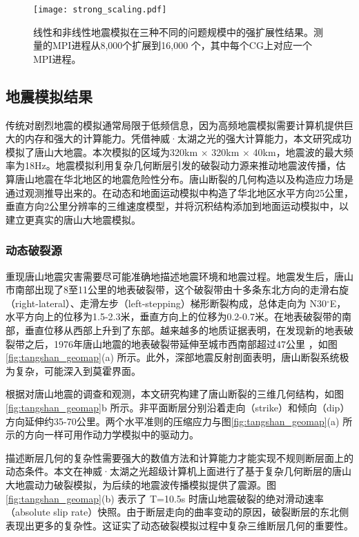 \begin{figure}[ht]
\centering
\texttt{[image: strong\_scaling.pdf]}
\caption{线性和非线性地震模拟在三种不同的问题规模中的强扩展性结果。测量的MPI进程从8,000个扩展到16,000 个，其中每个CG上对应一个MPI进程。}
\label{fig:strong-scaling}
\end{figure}


\subsection{地震模拟结果}

传统对剧烈地震的模拟通常局限于低频信息，因为高频地震模拟需要计算机提供巨大的内存和强大的计算能力。凭借神威·太湖之光的强大计算能力，本文研究成功模拟了唐山大地震。本次模拟的区域为320km $\times$ 320km $\times$ 40km，地震波的最大频率为18Hz。地震模拟利用复杂几何断层引发的破裂动力源来推动地震波传播，估算唐山地震在华北地区的地震危险性分布。唐山断裂的几何构造以及构造应力场是通过观测推导出来的。在动态和地面运动模拟中构造了华北地区水平方向25公里，垂直方向2公里分辨率的三维速度模型，并将沉积结构添加到地面运动模拟中，以建立更真实的唐山大地震模拟。

\subsubsection{动态破裂源}

重现唐山地震灾害需要尽可能准确地描述地震环境和地震过程。地震发生后，唐山市南部出现了8至11公里的地表破裂带，这个破裂带由十多条东北方向的走滑右旋（right-lateral）、走滑左步（left-stepping）梯形断裂构成，总体走向为 N30$^\circ$E，水平方向上的位移为1.5-2.3米，垂直方向上的位移为0.2-0.7米。在地表破裂带的南部，垂直位移从西部上升到了东部。越来越多的地质证据表明，在发现新的地表破裂带\citep {Qiu_discovery_2005}之后，1976年唐山地震的地表破裂带延伸至城市西南部超过47公里 \citep{guo_new_2011}，如图\ref{fig:tangshan_geomap}(a) 所示。此外，深部地震反射剖面表明，唐山断裂系统极为复杂，可能深入到莫霍界面\citep{liu_seismogenic_2007}。

根据对唐山地震的调查和观测，本文研究构建了唐山断裂的三维几何结构，如图\ref{fig:tangshan_geomap}b 所示。非平面断层分别沿着走向（strike）和倾向（dip）方向延伸约35-70公里。两个水平准则的压缩应力与图\ref{fig:tangshan_geomap}(a) 所示的方向一样可用作动力学模拟中的驱动力。

描述断层几何的复杂性需要强大的数值方法和计算能力才能实现不规则断层面上的动态条件。本文在神威·太湖之光超级计算机上面进行了基于复杂几何断层的唐山大地震动力破裂模拟，为后续的地震波传播模拟提供了震源。图 \ref{fig:tangshan_geomap}(b) 表示了 T=10.5s 时唐山地震破裂的绝对滑动速率（absolute slip rate）快照。由于断层走向的曲率变动的原因，破裂断层的东北侧表现出更多的复杂性。这证实了动态破裂模拟过程中复杂三维断层几何的重要性。

